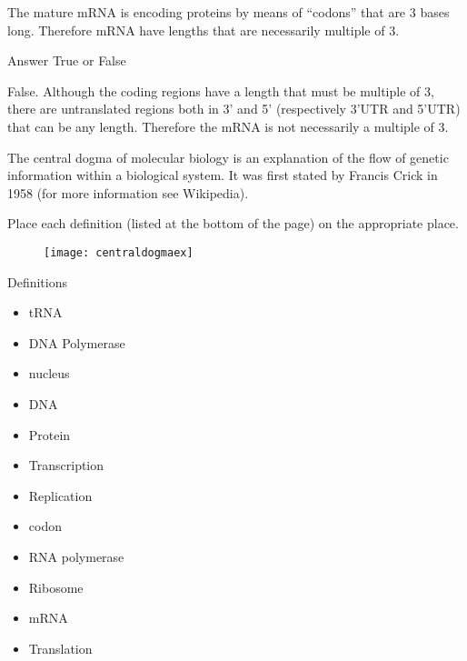 \begin{Exercise} [
  label={ex40},
  origin={G. Valle}
 ]

\Question The mature mRNA is encoding proteins by means of “codons” that are 3
bases long. Therefore mRNA have lengths that are necessarily multiple of 3.

Answer True or False

\end{Exercise}

\begin{Answer} [
  ref={ex40},
  number={1}
 ]

\Question False. Although the coding regions have a length that must be
multiple of 3, there are untranslated regions both in 3' and 5' (respectively
3'UTR and 5'UTR) that can be any length. Therefore the mRNA is not necessarily
a multiple of 3.

\end{Answer}

\begin{Exercise} [
  label={ex41},
  origin={G. Valle}
 ]

The central dogma of molecular biology is an explanation of the flow of genetic
information within a biological system. It was first stated by Francis Crick in
1958 (for more information see Wikipedia).

\Question Place each definition (listed at the bottom of the page) on the
appropriate place.

\begin{figure}[H]
\centering
\texttt{[image: centraldogmaex]}
\end{figure}

Definitions
\begin{itemize}
\item tRNA
\item DNA Polymerase
\item nucleus
\item DNA
\item Protein
\item Transcription
\item Replication
\item codon
\item RNA polymerase
\item Ribosome
\item mRNA
\item Translation
\end{itemize}

\end{Exercise}

